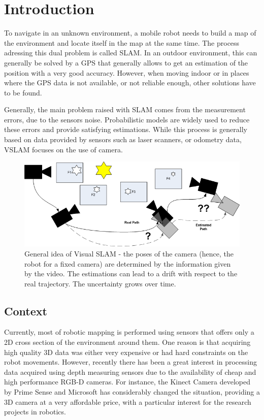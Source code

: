 \chapter{Introduction}

To navigate in an unknown environment, a mobile robot needs to build a map of the environment and locate itself in the map at the same time. The process adressing this dual problem is called \gls{SLAM}. In an outdoor environment, this can generally be solved by a GPS that generally allows to get an estimation of the position with a very good accuracy. However, when moving indoor or in places where the GPS data is not available, or not reliable enough, other solutions have to be found. 

Generally, the main problem raised with \gls{SLAM} comes from the measurement errors, due to the sensors noise. Probabilistic models are widely used to reduce these errors and provide satisfying estimations. While this process is generally based on data provided by sensors such as laser scanners, or odometry data, \gls{VSLAM} focuses on the use of camera.

\begin{figure}[h!]
\begin{center}
\includegraphics[width=1.0\textwidth]{figures/visual_slam}
\caption{General idea of Visual SLAM - the poses of the camera (hence, the robot for a fixed camera) are determined by the information given by the video. The estimations can lead to a drift with respect to the real trajectory. The uncertainty grows over time.}
\end{center}
\label{fig:vslam_overview}
\end{figure}

\section{Context}

Currently, most of robotic mapping is performed using sensors that offers only a 2D cross section of the environment around them. One reason is that acquiring high quality 3D data was either very expensive or had hard constraints on the robot movements. However, recently there has been a great interest in processing data acquired using depth measuring sensors due to the availability of cheap and high performance RGB-D cameras. For instance, the Kinect Camera developed by Prime Sense and Microsoft has considerably changed the situation, providing a 3D camera at a very affordable price, with a particular interest for the research projects in robotics.


